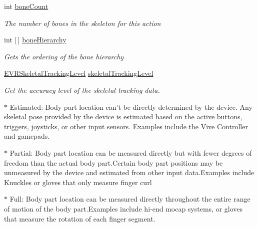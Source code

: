 \begin{DoxyCompactItemize}
int \mbox{\hyperlink{class_valve_1_1_v_r_1_1_steam_v_r___action___skeleton___source_aaf248e7b316e530e1b742204f9de4296}{bone\+Count}}
\begin{DoxyCompactList}\small\item\em The number of bones in the skeleton for this action \end{DoxyCompactList}\item 
int \mbox{[}$\,$\mbox{]} \mbox{\hyperlink{class_valve_1_1_v_r_1_1_steam_v_r___action___skeleton___source_a3d2d1a793268a78189508ab4b6fccd63}{bone\+Hierarchy}}
\begin{DoxyCompactList}\small\item\em Gets the ordering of the bone hierarchy \end{DoxyCompactList}\item 
\mbox{\hyperlink{namespace_valve_1_1_v_r_a6f46bd50fb65255d6537ab32a6bddc30}{E\+V\+R\+Skeletal\+Tracking\+Level}} \mbox{\hyperlink{class_valve_1_1_v_r_1_1_steam_v_r___action___skeleton___source_aebe1b7e7ed80abc1bdcf1712092dddf8}{skeletal\+Tracking\+Level}}
\begin{DoxyCompactList}\small\item\em Get the accuracy level of the skeletal tracking data. 

$\ast$ Estimated\+: Body part location can’t be directly determined by the device. Any skeletal pose provided by the device is estimated based on the active buttons, triggers, joysticks, or other input sensors. Examples include the Vive Controller and gamepads. 

$\ast$ Partial\+: Body part location can be measured directly but with fewer degrees of freedom than the actual body part.\+Certain body part positions may be unmeasured by the device and estimated from other input data.\+Examples include Knuckles or gloves that only measure finger curl 

$\ast$ Full\+: Body part location can be measured directly throughout the entire range of motion of the body part.\+Examples include hi-\/end mocap systems, or gloves that measure the rotation of each finger segment. \end{DoxyCompactList}\end{DoxyCompactItemize}
